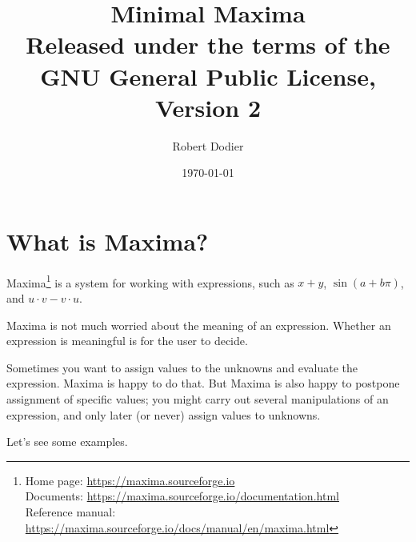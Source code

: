 \documentclass[12pt]{article}
\title{Minimal Maxima\\
{\small Released under the terms of the GNU General Public License, Version 2}}
\author{Robert Dodier}
\date{\today}
\begin{document}
\maketitle

\section{What is Maxima?}

Maxima\footnote{Home page: \url{https://maxima.sourceforge.io} \\
Documents: \url{https://maxima.sourceforge.io/documentation.html} \\
Reference manual: \url{https://maxima.sourceforge.io/docs/manual/en/maxima.html}}
is a system for working with expressions,
such as $x + y$, $\sin (a + b \pi)$, and $u \cdot v - v \cdot u$.

Maxima is not much worried about the meaning of an expression.
Whether an expression is meaningful is for the user to decide.

Sometimes you want to assign values to the unknowns 
and evaluate the expression.
Maxima is happy to do that.
But Maxima is also happy to postpone assignment of specific values;
you might carry out several manipulations of an expression,
and only later (or never) assign values to unknowns.

Let's see some examples.
\end{document}
